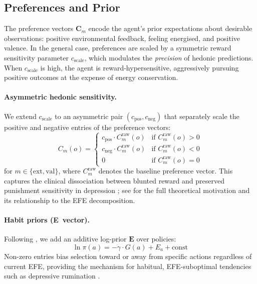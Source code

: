 \documentclass[11pt,a4paper]{article}
\begin{document}
\subsection{Preferences and Prior}

The preference vectors $\mathbf{C}_m$ encode the agent's prior expectations about desirable observations: positive environmental feedback, feeling energised, and positive valence. In the general case, preferences are scaled by a symmetric reward sensitivity parameter $c_{\text{scale}}$, which modulates the \emph{precision} of hedonic predictions. When $c_{\text{scale}}$ is high, the agent is reward-hypersensitive, aggressively pursuing positive outcomes at the expense of energy conservation.

\paragraph{Asymmetric hedonic sensitivity.} We extend $c_{\text{scale}}$ to an asymmetric pair $(c_{\text{pos}}, c_{\text{neg}})$ that separately scale the positive and negative entries of the preference vectors:
\begin{equation}
    C_m(o) = \begin{cases}
        c_{\text{pos}} \cdot C_m^{\text{raw}}(o) & \text{if } C_m^{\text{raw}}(o) > 0 \\
        c_{\text{neg}} \cdot C_m^{\text{raw}}(o) & \text{if } C_m^{\text{raw}}(o) < 0 \\
        0 & \text{if } C_m^{\text{raw}}(o) = 0
    \end{cases}
\end{equation}
for $m \in \{\text{ext}, \text{val}\}$, where $C_m^{\text{raw}}$ denotes the baseline preference vector. This captures the clinical dissociation between blunted reward and preserved punishment sensitivity in depression \citep{eshel2010reward, pizzagalli2014depression}; see \citet{albarracin2026temporal} for the full theoretical motivation and its relationship to the EFE decomposition.

\paragraph{Habit priors (E~vector).} Following \citet{dacosta2020active, albarracin2026temporal}, we add an additive log-prior $\mathbf{E}$ over policies:
\begin{equation}\label{eq:e_vector}
    \ln \pi(a) = -\gamma \cdot G(a) + E_a + \text{const}
\end{equation}
Non-zero entries bias selection toward or away from specific actions regardless of current EFE, providing the mechanism for habitual, EFE-suboptimal tendencies such as depressive rumination \citep{nolenhoeksema1991responses}.
\end{document}
